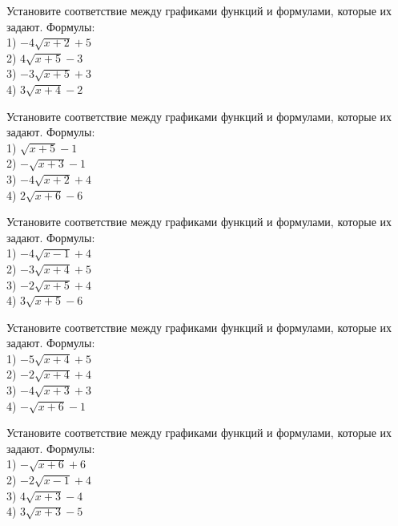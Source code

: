 \documentclass[4apaper]{article}
\begin{document}
\begin{taskBN}{86}
Установите соответствие между графиками функций и формулами, которые их задают. Формулы: \\1) $-4\sqrt{x+2}+5$\\2) $4\sqrt{x+5}-3$\\3) $-3\sqrt{x+5}+3$\\4) $3\sqrt{x+4}-2$
\end{taskBN}

\begin{taskBN}{87}
Установите соответствие между графиками функций и формулами, которые их задают. Формулы: \\1) $\sqrt{x+5}-1$\\2) $-\sqrt{x+3}-1$\\3) $-4\sqrt{x+2}+4$\\4) $2\sqrt{x+6}-6$
\end{taskBN}

\begin{taskBN}{88}
Установите соответствие между графиками функций и формулами, которые их задают. Формулы: \\1) $-4\sqrt{x-1}+4$\\2) $-3\sqrt{x+4}+5$\\3) $-2\sqrt{x+5}+4$\\4) $3\sqrt{x+5}-6$
\end{taskBN}

\begin{taskBN}{89}
Установите соответствие между графиками функций и формулами, которые их задают. Формулы: \\1) $-5\sqrt{x+4}+5$\\2) $-2\sqrt{x+4}+4$\\3) $-4\sqrt{x+3}+3$\\4) $-\sqrt{x+6}-1$
\end{taskBN}

\begin{taskBN}{90}
Установите соответствие между графиками функций и формулами, которые их задают. Формулы: \\1) $-\sqrt{x+6}+6$\\2) $-2\sqrt{x-1}+4$\\3) $4\sqrt{x+3}-4$\\4) $3\sqrt{x+3}-5$
\end{taskBN}
\end{document}
